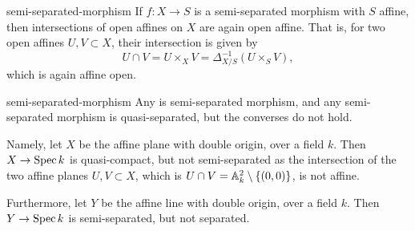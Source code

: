 \begin{example}{semi-separated-morphism}
    If $f : X \to S$ is a semi-separated morphism with $S$ affine, then intersections of open affines on $X$ are again open affine. That is, for two open affines $U, V \subset X$, their intersection is given by
    \[ U \cap V = U \times_X V = \Delta_{X/S}^{-1}(U \times_S V) , \]
    which is again affine open.
\end{example}

\begin{example}{semi-separated-morphism}
    Any  is semi-separated morphism, and any semi-separated morphism is quasi-separated, but the converses do not hold.
    
    Namely, let $X$ be the affine plane with double origin, over a field $k$. Then $X \to \Spec k$ is quasi-compact, but not semi-separated as the intersection of the two affine planes $U, V \subset X$, which is $U \cap V = \AA^2_k \setminus \{ (0, 0) \}$, is not affine.
    
    Furthermore, let $Y$ be the affine line with double origin, over a field $k$. Then $Y \to \Spec k$ is semi-separated, but not separated.
\end{example}

